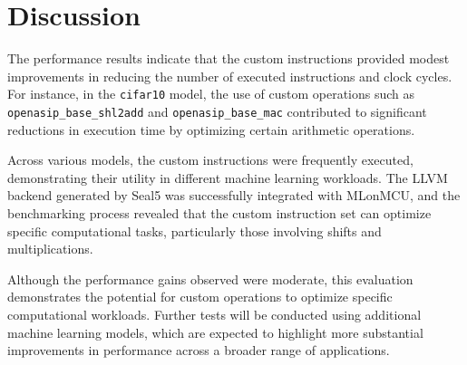 \section{Discussion}

The performance results indicate that the custom instructions provided modest improvements in reducing the number of executed instructions and clock cycles. For instance, in the \texttt{cifar10} model, the use of custom operations such as \texttt{openasip\_base\_shl2add} and \texttt{openasip\_base\_mac} contributed to significant reductions in execution time by optimizing certain arithmetic operations.

Across various models, the custom instructions were frequently executed, demonstrating their utility in different machine learning workloads. The LLVM backend generated by Seal5 was successfully integrated with MLonMCU, and the benchmarking process revealed that the custom instruction set can optimize specific computational tasks, particularly those involving shifts and multiplications.

Although the performance gains observed were moderate, this evaluation demonstrates the potential for custom operations to optimize specific computational workloads. Further tests will be conducted using additional machine learning models, which are expected to highlight more substantial improvements in performance across a broader range of applications.